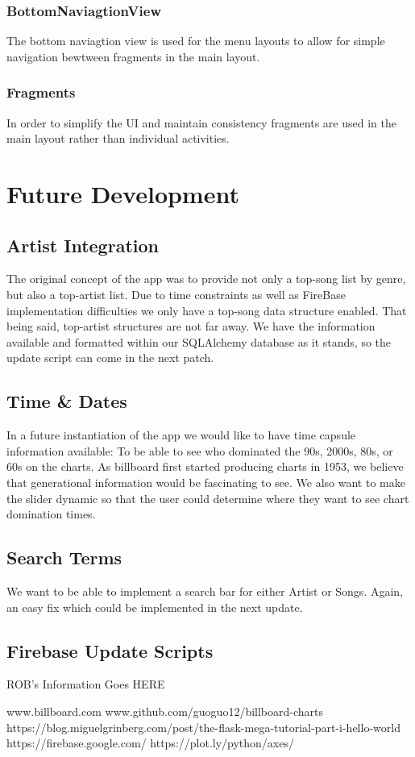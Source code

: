 \documentclass{article}
\begin{document}
\subsubsection*{BottomNaviagtionView}
The bottom naviagtion view is used for the menu layouts to allow for simple navigation bewtween fragments in the main layout.
\subsubsection*{Fragments}
In order to simplify the UI and maintain consistency fragments are used in the main layout rather than individual activities. 

\section*{Future Development}
\subsection*{Artist Integration}
The original concept of the app was to provide not only a top-song list by genre, but also a top-artist list. Due to time constraints as well as FireBase implementation difficulties we only have a top-song data structure enabled. That being said, top-artist structures are not far away. We have the information available and formatted within our SQLAlchemy database as it stands, so the update script can come in the next patch.
\subsection*{Time \& Dates}
In a future instantiation of the app we would like to have time capsule information available: To be able to see who dominated the 90s, 2000s, 80s, or 60s on the charts. As billboard first started producing charts in 1953, we believe that generational information would be fascinating to see. We also want to make the slider dynamic so that the user could determine where they want to see chart domination times. 
\subsection*{Search Terms}
We want to be able to implement a search bar for either Artist or Songs. Again, an easy fix which could be implemented in the next update.  
\subsection*{Firebase Update Scripts}






ROB's Information Goes HERE







\begin{thebibliography}{00}
www.billboard.com
www.github.com/guoguo12/billboard-charts
https://blog.miguelgrinberg.com/post/the-flask-mega-tutorial-part-i-hello-world
https://firebase.google.com/
https://plot.ly/python/axes/
\end{thebibliography}
\end{document}
